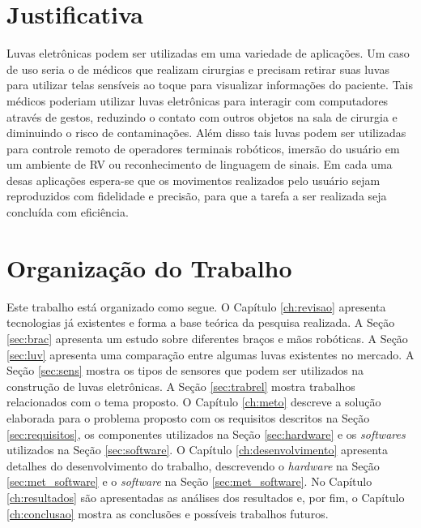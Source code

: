 \section{Justificativa}
\label{sec:jus}
Luvas eletrônicas podem ser utilizadas em uma variedade de aplicações. Um caso de uso seria o de médicos que realizam cirurgias e precisam retirar suas luvas para utilizar telas sensíveis ao toque para visualizar informações do paciente. Tais médicos poderiam utilizar luvas eletrônicas para interagir com computadores através de gestos, reduzindo o contato com outros objetos na sala de cirurgia e diminuindo o risco de contaminações. Além disso tais luvas podem ser utilizadas para controle remoto de operadores terminais robóticos, imersão do usuário em um ambiente de \ac{RV} ou reconhecimento de linguagem de sinais. Em cada uma desas aplicações espera-se que os movimentos realizados pelo usuário sejam reproduzidos com fidelidade e precisão, para que a tarefa a ser realizada seja concluída com eficiência.


\section{Organização do Trabalho}
\label{sec:org}
Este trabalho está organizado como segue. O Capítulo \ref{ch:revisao} apresenta tecnologias já existentes e forma a base teórica da pesquisa realizada. A Seção \ref{sec:brac} apresenta um estudo sobre diferentes braços e mãos robóticas. A Seção \ref{sec:luv} apresenta uma comparação entre algumas luvas existentes no mercado. A Seção \ref{sec:sens} mostra os tipos de sensores que podem ser utilizados na construção de luvas eletrônicas. A Seção \ref{sec:trabrel} mostra trabalhos relacionados com o tema proposto. O Capítulo \ref{ch:meto} descreve a solução elaborada para o problema proposto com os requisitos descritos na Seção \ref{sec:requisitos}, os componentes utilizados na Seção \ref{sec:hardware} e os \textit{softwares} utilizados na Seção \ref{sec:software}. O Capítulo \ref{ch:desenvolvimento} apresenta detalhes do desenvolvimento do trabalho, descrevendo o \textit{hardware} na Seção \ref{sec:met_software} e o \textit{software} na Seção \ref{sec:met_software}. No Capítulo \ref{ch:resultados} são apresentadas as análises dos resultados e, por fim, o Capítulo \ref{ch:conclusao} mostra as conclusões e possíveis trabalhos futuros.
